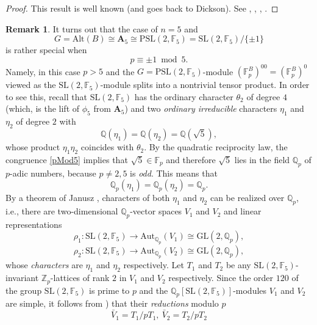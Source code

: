 \documentclass[12pt,a4paper,reqno]{amsart}
\def\Q{{\mathbb Q}}
\def\Z{{\mathbb Z}}
\def\F{{\mathbb F}}
\def\Alt{\mathrm{Alt}}
\def\Aut{\mathrm{Aut}}
\def\GL{\mathrm{GL}}
\def\SL{\mathrm{SL}}
\theoremstyle{definition}
\newtheorem{rem}[thm]{Remark}
\begin{document}
\begin{proof}
 This  result is well known (and goes back to Dickson).  See   \cite[Th. 5.2 on p. 133]{Glasgow}, \cite{Wagner}, \cite{Mortimer}, \cite[Lemma 2.6]{ZarhinCrelle}.
\end{proof}

\begin{rem}
\label{A5notVery}
It turns out that the case of $n=5$ and 
$$G=\Alt(B)\cong \mathbf{A}_5\cong \mathrm{PSL}(2,\F_5)=\mathrm{SL}(2,\F_5)/\{\pm 1\}$$ 
is rather special when
\begin{equation}
\label{pMod5} 
p \equiv \pm 1 \bmod 5.
\end{equation}
 Namely,  in this case $p>5$ and 
the $G=\mathrm{PSL}(2,\F_5)$-module $(\F_p^{B})^{00}=(\F_p^{B})^0$  viewed as the $\SL(2, \F_5)$-module splits into a nontrivial tensor 
product. In order to see this, recall \cite[Sect. 38]{Dornhoff} that $\mathrm{SL}(2,\F_5)$ has the ordinary character $\theta_2$ of degree $4$ (which, is the lift
of $\phi_5$  from $\mathbf{A}_5$)
and
 two {\sl ordinary irreducible} characters $\eta_1$ and $\eta_2$ of degree $2$ with
$$\Q(\eta_1)=\Q(\eta_2)=\Q(\sqrt{5}),$$
whose product $\eta_1 \eta_2$ coincides with $\theta_2$.
By the quadratic reciprocity law,
the congruence \eqref{pMod5}  implies that $\sqrt{5} \in \F_p$ and therefore $\sqrt{5}$ lies in the field $\Q_p$ of $p$-adic numbers,
because $p \ne 2,5$ is {\sl odd}. This means that
$$\Q_p(\eta_1)=\Q_p(\eta_2)=\Q_p.$$
By a theorem of Janusz \cite[Theorem (d) on p. 3-4]{Janusz}, characters of both $\eta_1$  and $\eta_2$ can be realized over $\Q_p$,
i.e., there are two-dimensional $\Q_p$-vector spaces $V_1$ and $V_2$ and
linear representations
\begin{equation}
\label{rho1rho2}
\rho_1: \mathrm{SL}(2,\F_5) \to \Aut_{\Q_p}(V_1) \cong \GL(2,\Q_p), 
\end{equation}
$$ \rho_2: \mathrm{SL}(2,\F_5) \to \Aut_{\Q_p}(V_2)\cong \GL(2,\Q_p),$$
whose {\sl characters} are $\eta_1$ and $\eta_2$ respectively.  Let $T_1$ and $T_2$ be any $\mathrm{SL}(2,\F_5)$-invariant $\Z_p$-lattices of rank $2$ in $V_1$ and $V_2$ respectively.
Since the order $120$ of the group $\mathrm{SL}(2,\F_5)$ is prime to $p$ and  the $\Q_p[\mathrm{SL}(2,\F_5)]$-modules $V_1$ and $V_2$ are simple, 
it follows from  \cite[Sect. 15.5, Prop. 43]{SerreRep}) that
their {\sl reductions} modulo $p$
$$\bar{V}_1=T_1/pT_1, \ \bar{V}_2=T_2/pT_2$$

\end{rem}
\end{document}
